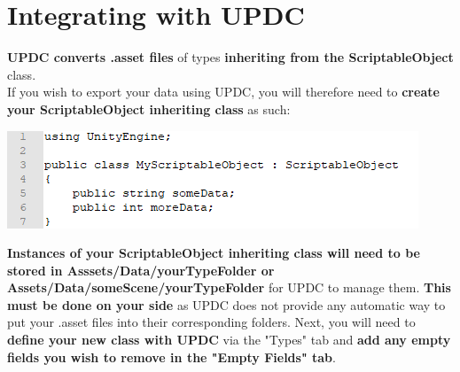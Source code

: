 \documentclass[10pt,a4paper]{article}
\begin{document}
\section{Integrating with UPDC}
\textbf{UPDC converts .asset files} of types \textbf{inheriting from the ScriptableObject} class.\\
If you wish to export your data using UPDC, you will therefore need to \textbf{create your ScriptableObject inheriting class} as such:
\begin{center}
\includegraphics[scale=1.0]{soExample}
\end{center}
\textbf{Instances of your ScriptableObject inheriting class will need to be stored in Asssets/Data/yourTypeFolder or Assets/Data/someScene/yourTypeFolder} for UPDC to manage them. \textbf{This must be done on your side} as UPDC does not provide any automatic way to put your .asset files into their corresponding folders.
Next, you will need to \textbf{define your new class with UPDC} via the "Types" tab and \textbf{add any empty fields you wish to remove in the "Empty Fields" tab}.
\end{document}
